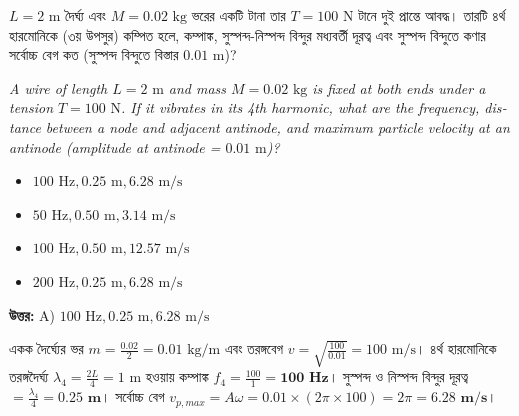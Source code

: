 \documentclass[12pt, a4paper]{article}
\begin{document}
\vspace{2em}

\begin{tcolorbox}[questionbox={প্রশ্ন (Question) 5}]
    \noindent
    $L = 2\text{ m}$ দৈর্ঘ্য এবং $M = 0.02\text{ kg}$ ভরের একটি টানা তার $T = 100\text{ N}$ টানে দুই প্রান্তে আবদ্ধ। তারটি ৪র্থ হারমোনিকে (৩য় উপসুর) কম্পিত হলে, কম্পাঙ্ক, সুস্পন্দ-নিস্পন্দ বিন্দুর মধ্যবর্তী দূরত্ব এবং সুস্পন্দ বিন্দুতে কণার সর্বোচ্চ বেগ কত (সুস্পন্দ বিন্দুতে বিস্তার $0.01\text{ m}$)?
    
    \vspace{0.8em}
    \begin{english}
    \noindent\textit{\color{darkgray}
    A wire of length $L = 2\text{ m}$ and mass $M = 0.02\text{ kg}$ is fixed at both ends under a tension $T = 100\text{ N}$. If it vibrates in its 4th harmonic, what are the frequency, distance between a node and adjacent antinode, and maximum particle velocity at an antinode (amplitude at antinode = $0.01\text{ m}$)?
    }
    \end{english}
\end{tcolorbox}

\begin{itemize}[label={}, leftmargin=1cm, itemsep=0.5em]
    \item[\textbf{A)}] $100\text{ Hz}, 0.25\text{ m}, 6.28\text{ m/s}$
    \item[\textbf{B)}] $50\text{ Hz}, 0.50\text{ m}, 3.14\text{ m/s}$
    \item[\textbf{C)}] $100\text{ Hz}, 0.50\text{ m}, 12.57\text{ m/s}$
    \item[\textbf{D)}] $200\text{ Hz}, 0.25\text{ m}, 6.28\text{ m/s}$
\end{itemize}

\vspace{0.5em}
\begin{tcolorbox}[answerbox]
    \textbf{\color{success} উত্তর:} A) $100\text{ Hz}, 0.25\text{ m}, 6.28\text{ m/s}$
\end{tcolorbox}
\vspace{1em}

\begin{tcolorbox}[solutionbox={সমাধান (Solution)}]
    \noindent
    একক দৈর্ঘ্যের ভর $m = \frac{0.02}{2} = 0.01\text{ kg/m}$ এবং তরঙ্গবেগ $v = \sqrt{\frac{100}{0.01}} = 100\text{ m/s}$। ৪র্থ হারমোনিকে তরঙ্গদৈর্ঘ্য $\lambda_4 = \frac{2L}{4} = 1\text{ m}$ হওয়ায় কম্পাঙ্ক $f_4 = \frac{100}{1} = \mathbf{100\text{ Hz}}$। সুস্পন্দ ও নিস্পন্দ বিন্দুর দূরত্ব $= \frac{\lambda_4}{4} = \mathbf{0.25\text{ m}}$। সর্বোচ্চ বেগ $v_{p,max} = A \omega = 0.01 \times (2\pi \times 100) = 2\pi = \mathbf{6.28\text{ m/s}}$।
\end{tcolorbox}
\end{document}
